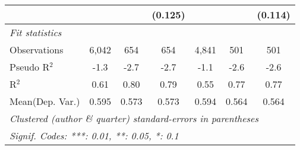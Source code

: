 \begin{tabular}{lcccccc}
                                  &              &              & (0.125)        &             &               & (0.114)\\   
   \midrule
   \emph{Fit statistics}\\
   Observations                   & 6,042        & 654          & 654            & 4,841       & 501           & 501\\  
   Pseudo R$^2$                   & -1.3         & -2.7         & -2.7           & -1.1        & -2.6          & -2.6\\  
   R$^2$                          & 0.61         & 0.80         & 0.79           & 0.55        & 0.77          & 0.77\\  
Mean(Dep. Var.) & 0.595 & 0.573 & 0.573 & 0.594 & 0.564 & 0.564 \\
   \midrule \midrule
   \multicolumn{7}{l}{\emph{Clustered (author \& quarter) standard-errors in parentheses}}\\
   \multicolumn{7}{l}{\emph{Signif. Codes: ***: 0.01, **: 0.05, *: 0.1}}\\
\end{tabular}
\par\endgroup
